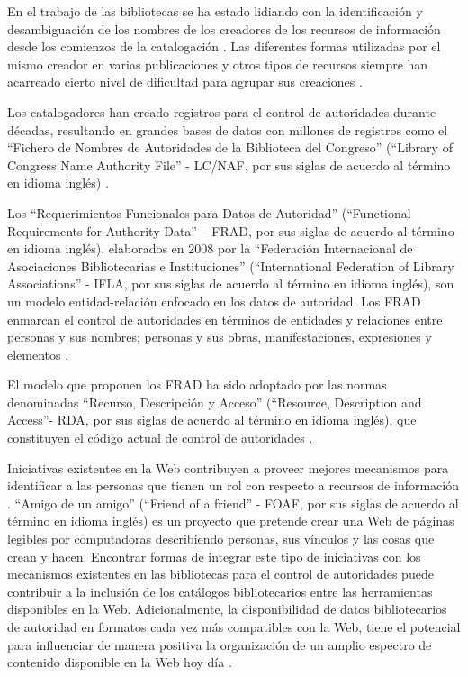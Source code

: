 En el trabajo de las bibliotecas se ha estado lidiando con la identificación y desambiguación de los nombres de los creadores de los recursos de información desde los comienzos de la catalogación \citep{Harper2007}. Las diferentes formas utilizadas por el mismo creador en varias publicaciones y otros tipos de recursos siempre han acarreado cierto nivel de dificultad para agrupar sus creaciones \citep{Harper2007}.

Los catalogadores han creado registros para el control de autoridades durante décadas, resultando en grandes bases de datos con millones de registros como el ``Fichero de Nombres de Autoridades de la Biblioteca del Congreso'' (``Library of Congress Name Authority File'' - LC/NAF, por sus siglas de acuerdo al término en idioma inglés) \citep{Sandberg2016}.

Los ``Requerimientos Funcionales para Datos de Autoridad'' (``Functional Requirements for Authority Data'' – FRAD, por sus siglas de acuerdo al término en idioma inglés), elaborados en 2008 por la ``Federación Internacional de Asociaciones Bibliotecarias e Instituciones'' (``International Federation of Library Associations'' - IFLA, por sus siglas de acuerdo al término en idioma inglés), son un modelo entidad-relación enfocado en los datos de autoridad. Los FRAD enmarcan el control de autoridades en términos de entidades y relaciones entre personas y sus nombres; personas y sus obras, manifestaciones, expresiones y elementos \citep{InternationalFederationofLibraryAssociationsandInstitutions2009,Sandberg2016}.

El modelo que proponen los FRAD ha sido adoptado por las normas denominadas ``Recurso, Descripción y Acceso'' (``Resource, Description and Access''- RDA, por sus siglas de acuerdo al término en idioma inglés), que constituyen el código actual de control de autoridades \citep{Sandberg2016}.

Iniciativas existentes en la Web contribuyen a proveer mejores mecanismos para identificar a las personas que tienen un rol con respecto a recursos de información \citep{Harper2007}. ``Amigo de un amigo'' (``Friend of a friend'' - FOAF, por sus siglas de acuerdo al término en idioma inglés) es un proyecto que pretende crear una Web de páginas legibles por computadoras describiendo personas, sus vínculos y las cosas que crean y hacen. Encontrar formas de integrar este tipo de iniciativas con los mecanismos existentes en las bibliotecas para el control de autoridades puede contribuir a la inclusión de los catálogos bibliotecarios entre las herramientas disponibles en la Web. Adicionalmente, la disponibilidad de datos bibliotecarios de autoridad en formatos cada vez más compatibles con la Web, tiene el potencial para influenciar de manera positiva la organización de un amplio espectro de contenido disponible en la Web hoy día \citep{Harper2007}.

